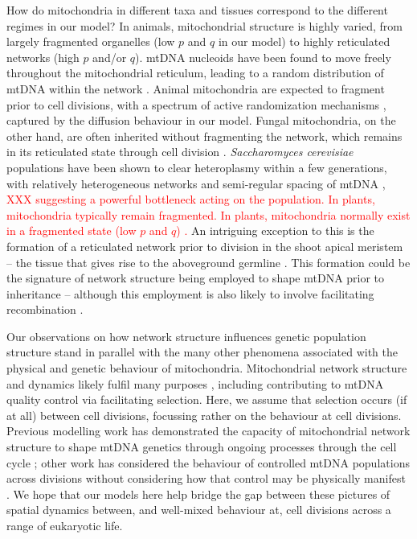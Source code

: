 \documentclass{article}
\begin{document}
How do mitochondria in different taxa and tissues correspond to the different regimes in our model? In animals, mitochondrial structure is highly varied, from largely fragmented organelles (low $p$ and $q$ in our model) to highly reticulated networks (high $p$ and/or $q$). mtDNA nucleoids have been found to move freely throughout the mitochondrial reticulum, leading to a random distribution of mtDNA within the network \citep{legros2004organization, sasaki2017live}. Animal mitochondria are expected to fragment prior to cell divisions, with a spectrum of active randomization mechanisms \citep{pangou2021multifaceted, moore2021actin}, captured by the diffusion behaviour in our model. Fungal mitochondria, on the other hand, are often inherited without fragmenting the network, which remains in its reticulated state through cell division \citep{mendoza2020mitochondrial}. \textit{Saccharomyces cerevisiae} populations have been shown to clear heteroplasmy within a few generations, with relatively heterogeneous networks and semi-regular spacing of mtDNA \citep{jakubke2021cristae}, \textcolor{red}{XXX suggesting a powerful bottleneck acting on the population. In plants, mitochondria typically remain fragmented. In plants, mitochondria normally exist in a fragmented state (low $p$ and $q$) \citep{logan2010dynamic, chustecki2021network}.} An intriguing exception to this is the formation of a reticulated network prior to division in the shoot apical meristem -- the tissue that gives rise to the aboveground germline \cite{segui2009mitochondrial}. This formation could be the signature of network structure being employed to shape mtDNA prior to inheritance -- although this employment is also likely to involve facilitating recombination \cite{edwards2021avoiding}. 
 
Our observations on how network structure influences genetic population structure stand in parallel with the many other phenomena associated with the physical and genetic behaviour of mitochondria. Mitochondrial network structure and dynamics likely fulfil many purposes \cite{hoitzing2015function}, including contributing to mtDNA quality control \citep{twig2008mitochondrial, twig2008fission} via facilitating selection. Here, we assume that selection occurs (if at all) between cell divisions, focussing rather on the behaviour at cell divisions. Previous modelling work has demonstrated the capacity of mitochondrial network structure to shape mtDNA genetics through ongoing processes through the cell cycle \cite{aryaman2019mitochondrial, edwards2021avoiding}; other work has considered the behaviour of controlled mtDNA populations across divisions without considering how that control may be physically manifest \cite{johnston2015closed, johnston2016evolution}. We hope that our models here help bridge the gap between these pictures of spatial dynamics between, and well-mixed behaviour at, cell divisions across a range of eukaryotic life.
 
\end{document}
